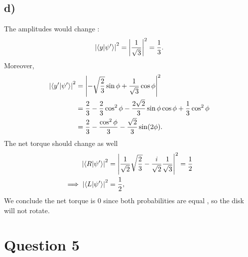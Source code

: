 \documentclass[
	12pt,
	]{article}
\theoremstyle{definition}
\theoremstyle{definition}
\theoremstyle{definition}
\theoremstyle{definition}
\theoremstyle{definition}
\theoremstyle{example}
\theoremstyle{note}
\theoremstyle{remark}
\theoremstyle{example}
\begin{document}
		\subsection*{d) }
			The amplitudes would change : 
			$$ \abs{\braket{y}{\psi'}}^{2} = \abs{\frac{1}{\sqrt{3}}}^{2} = \frac13.$$
			Moreover, 
			\begin{align*}
				\abs{\braket{y'}{\psi'}}^{2} &= \abs{-\sqrt{\frac{2}{3}} \sin \phi + \frac{1}{\sqrt{3}} \cos \phi}^{2} \\
				 &=\frac23 - \frac{2}{3} \cos^{2} \phi - \frac{2\sqrt{2}}{3}\sin \phi \cos \phi + \frac13 \cos^{2} \phi \\
				 &=\frac23 - \frac{\cos^{2}\phi}{3} - \frac{\sqrt{2}}{3} \sin(2\phi).
			\end{align*}
			The net torque should change as well
			\begin{align*}
				\abs{\braket{R}{\psi'}}^{2} &= \abs{\frac{1}{\sqrt{2}} \sqrt{\frac{2}{3}} - \frac{i}{\sqrt{2}} \frac{1}{\sqrt{3}}}^{2} = \frac12 \\
				\implies \abs{\braket{L}{\psi'}}^{2} &= \frac12,
			\end{align*}
			We conclude the net torque is $0$ since both probabilities are equal , so the disk will not rotate.
		\section*{Question 5}
\end{document}

